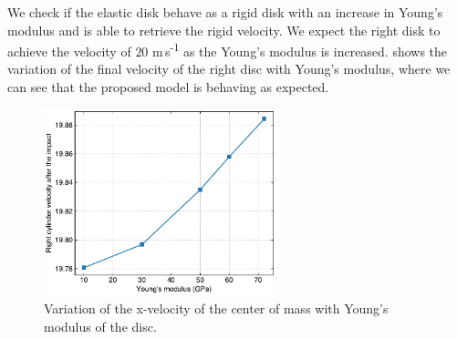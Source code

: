 We check if the elastic disk behave as a rigid disk with an increase in
Young's modulus and is able to retrieve the rigid velocity. We expect the
right disk to achieve the velocity of $20$ m\,s\textsuperscript{-1} as the
Young's modulus is increased. 
shows the variation of the final velocity of the right disc with Young's
modulus, where we can see that the proposed model is behaving as expected.
\begin{figure}[!htpb]
  \centering
  \includegraphics[width=0.6\textwidth]{figures/csph/figures/yan_2021_curved_interface/E_vs_velocity}
  \caption{Variation of the x-velocity of the center of mass with Young's
    modulus of the disc.}
\label{fig:results-yan-curved-E-vs-velocity}
\end{figure}

\FloatBarrier%
